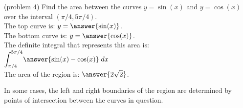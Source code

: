 \documentclass[handout]{ximera}
\begin{document}
                    
                    
                                         
\begin{problem}(problem 4)
Find the area between the curves $y = \sin(x)$ and $y = \cos(x)$ over the interval $(\pi/4, 5\pi/4)$.\\


The top curve is: $y = \answer{\sin(x)}$.\\
The bottom curve is: $y = \answer{\cos(x)}$.\\
The definite integral that represents this area is: $\displaystyle{\int_{\pi/4}^{5\pi/4}} \answer{\sin(x) - \cos(x)} \; dx$\\
The area of the region is: $\answer{2\sqrt 2}$.


\end{problem}

In some cases, the left and right boundaries of the region are determined by points of intersection between the curves in question.
\end{document}
